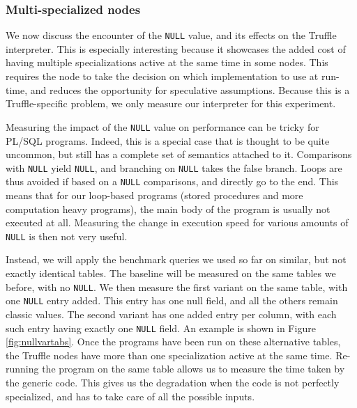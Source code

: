 \documentclass[twoside,11pt,a4paper]{article}
\newcommand{\pls}[1]{\texttt{#1}}
\newcommand{\plsnull}{\pls{NULL}}
\begin{document}
\subsubsection{Multi-specialized nodes}

We now discuss the encounter of the \plsnull{} value, and its effects on the Truffle interpreter. This is especially interesting because it showcases the added cost of having multiple specializations active at the same time in some nodes. This requires the node to take the decision on which implementation to use at run-time, and reduces the opportunity for speculative assumptions. Because this is a Truffle-specific problem, we only measure our interpreter for this experiment.

Measuring the impact of the \plsnull{} value on performance can be tricky for PL/SQL programs. Indeed, this is a special case that is thought to be quite uncommon, but still has a complete set of semantics attached to it. Comparisons with \plsnull{} yield \plsnull{}, and branching on \plsnull{} takes the false branch. Loops are thus avoided if based on a \plsnull{} comparisons, and directly go to the end. This means that for our loop-based programs (stored procedures and more computation heavy programs), the main body of the program is usually not executed at all. Measuring the change in execution speed for various amounts of \plsnull{} is then not very useful.

Instead, we will apply the benchmark queries we used so far on similar, but not exactly identical tables. The baseline will be measured on the same tables we before, with no \plsnull{}. We then measure the first variant on the same table, with one \plsnull{} entry added. This entry has one null field, and all the others remain classic values. The second variant has one added entry per column, with each such entry having exactly one \plsnull{} field. An example is shown in Figure \ref{fig:nullvartabs}. Once the programs have been run on these alternative tables, the Truffle nodes have more than one specialization active at the same time. Re-running the program on the same table allows us to measure the time taken by the generic code. This gives us the degradation when the code is not perfectly specialized, and has to take care of all the possible inputs.
\end{document}
